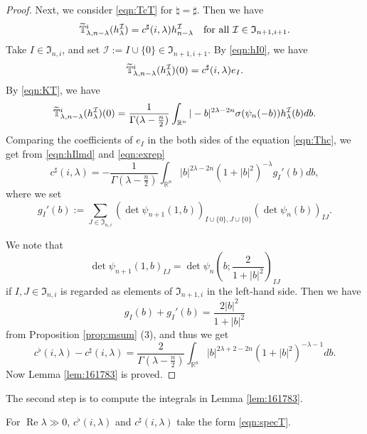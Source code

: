 \begin{proof}
Next,
 we consider \eqref{eqn:TcT} for $\natural =\sharp$.  
Then we have 
\[
  \widetilde{{\mathbb{T}}}_{{\lambda},{n-\lambda}}^{{i}} (h_{\lambda}^{\mathcal{I}})
  =
  c^{\sharp}(i,\lambda) h_{n-\lambda}^{\mathcal{I}}
\quad
\text{for all ${\mathcal{I}} \in {\mathfrak {I}}_{n+1,i+1}$.}
\]  
Take $I \in {\mathfrak {I}}_{n,i}$, 
 and set ${\mathcal{I}}:=I \cup \{0\} \in {\mathfrak {I}}_{n+1,i+1}$.  
By \eqref{eqn:hI0}, 
 we have
\begin{equation}
\label{eqn:Thc}
\widetilde{{\mathbb{T}}}_{{\lambda},{n-\lambda}}^{{i}} (h_{\lambda}^{\mathcal{I}})(0)
  =
  c^{\sharp}(i,\lambda) e_I.  
\end{equation}
By \eqref{eqn:KT}, 
 we have
\begin{equation*}
\widetilde{{\mathbb{T}}}_{{\lambda},{n-\lambda}}^{{i}} (h_{\lambda}^{\mathcal{I}})(0)
  = \frac{1}{\Gamma(\lambda-\frac n 2)}
     \int_{\mathbb{R}^n} |-b|^{2 \lambda-2n} \sigma(\psi_n(-b)) h_{\lambda}^{\mathcal{I}} (b) d b.  
\end{equation*}
Comparing the coefficients of $e_{I}$ in the both sides of the equation \eqref{eqn:Thc}, 
 we get from \eqref{eqn:hIlmd} and \eqref{eqn:exrep}
\[
  c^{\sharp}(i,\lambda)
 =- \frac{1}{\Gamma(\lambda-\frac n 2)}
    \int_{\mathbb{R}^n} |b|^{2\lambda-2n} (1+|b|^2)^{-\lambda}
    g_I'(b)
        d b, 
\]
 where we set 
\[
g_{I}'(b):=\sum_{J \in {\mathfrak{I}}_{n,i}}
(\det \psi_{n+1}(1,b))_{I \cup \{0\}, J\cup \{0\}}
       (\det \psi_{n}(b))_{I J}.  
\]



We note 
 that 
\[
  \det \psi_{n+1}(1,b)_{I J}
  =
  \det \psi_{n}(b;\frac{2}{1+|b|^2})_{I J}
\]
if $I, J \in {\mathfrak{I}}_{n,i}$ is regarded as elements
 of ${\mathfrak{I}}_{n+1,i}$
 in the left-hand side.  
Then we have
\[
   g_I(b)+g_I'(b)=\frac{2|b|^2}{1+|b|^2}
\]
{}from Proposition \ref{prop:msum} (3), 
 and thus we get 
\[
 c^{\flat}(i,\lambda)-c^{\sharp}(i,\lambda)
 =\frac{2}{\Gamma(\lambda-\frac n 2)} 
   \int_{\mathbb{R}^n} |b|^{2\lambda+2-2n} (1+|b|^2)^{-\lambda-1} d b.  
\]
Now Lemma \ref{lem:161783} is proved.  
\end{proof}
The second step is to compute the integrals in Lemma \ref{lem:161783}.  
\begin{lemma}
\label{lem:cTcompute}
For $\operatorname{Re}\lambda \gg 0$, 
$c^{\flat}(i,\lambda)$ and $c^{\sharp}(i,\lambda)$ take 
the form \eqref{eqn:specT}.  
\end{lemma}
